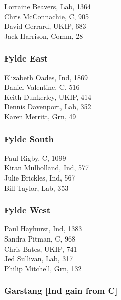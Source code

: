 \documentclass[a4paper,openany,10pt]{book}
\begin{document}


Lorraine Beavers, Lab, 1364\\
Chris McConnachie, C, 905\\
David Gerrard, UKIP, 683\\
Jack Harrison, Comm, 28\\


\subsubsection*{Fylde East}



Elizabeth Oades, Ind, 1869\\
Daniel Valentine, C, 516\\
Keith Dunkerley, UKIP, 414\\
Dennis Davenport, Lab, 352\\
Karen Merritt, Grn, 49\\


\subsubsection*{Fylde South}



Paul Rigby, C, 1099\\
Kiran Mulholland, Ind, 577\\
Julie Brickles, Ind, 567\\
Bill Taylor, Lab, 353\\


\subsubsection*{Fylde West}



Paul Hayhurst, Ind, 1383\\
Sandra Pitman, C, 968\\
Chris Bates, UKIP, 741\\
Jed Sullivan, Lab, 317\\
Philip Mitchell, Grn, 132\\


\subsubsection*{Garstang \hspace*{\fill}\nolinebreak[1]%
\enspace\hspace*{\fill}
[Ind gain from C]}
\end{document}
